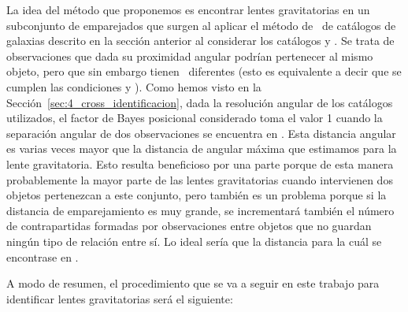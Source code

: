 La idea del método que proponemos es encontrar lentes gravitatorias en un subconjunto de emparejados que surgen al aplicar el método de \cross\ de catálogos de galaxias descrito en la sección anterior al considerar los catálogos \hatlas y \gama. Se trata de observaciones que dada su proximidad angular podrían pertenecer al mismo objeto, pero que sin embargo tienen \rts\ diferentes (esto es equivalente a decir que se cumplen las condiciones  y ).
Como hemos visto en la Sección~\ref{sec:4_cross_identificacion}, dada la resolución angular de los catálogos utilizados, el factor de Bayes posicional considerado toma el valor 1 cuando la separación angular de dos observaciones se encuentra en  . Esta distancia angular es varias veces mayor que la distancia de angular máxima que estimamos para la lente gravitatoria. Esto resulta beneficioso por una parte porque de esta manera probablemente la mayor parte de las lentes gravitatorias cuando intervienen dos objetos pertenezcan a este conjunto, pero también es un problema porque si la distancia de emparejamiento es muy grande, se incrementará también el número de contrapartidas formadas por observaciones entre objetos que no guardan ningún tipo de relación entre sí. Lo ideal sería que la distancia para la cuál  se encontrase en .

A modo de resumen, el procedimiento que se va a seguir en este trabajo para identificar lentes gravitatorias será el siguiente: 

\vspace{-3mm}

